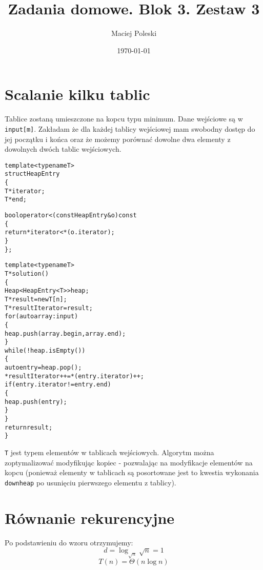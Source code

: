\documentclass[a4paper,12pt]{article}
\title{Zadania domowe. Blok 3. Zestaw 3}
\author{Maciej Poleski}
\date{\today}
\begin{document}
\maketitle

\newpage

\section{Scalanie kilku tablic}
Tablice zostaną umieszczone na kopcu typu minimum. Dane wejściowe są w \verb|input[m]|. Zakładam że dla każdej tablicy wejściowej mam swobodny dostęp do jej początku i końca oraz że możemy porównać dowolne dwa elementy z dowolnych dwóch tablic wejściowych.
\begin{alltt}
template<typename T>
struct HeapEntry
\{
    T *iterator;
    T *end;
    
    bool operator<(const HeapEntry &o) const
    \{
        return *iterator<*(o.iterator);
    \}
\};

template<typename T>
T* solution()
\{
    Heap<HeapEntry<T>> heap;
    T* result=new T[n];
    T* resultIterator=result;
    for(auto array : input)
    \{
        heap.push({array.begin, array.end});
    \}
    while(!heap.isEmpty())
    \{
        auto entry=heap.pop();
        *resultIterator++=*(entry.iterator)++;
        if(entry.iterator!=entry.end)
        \{
            heap.push(entry);
        \}
    \}
    return result;
\}
\end{alltt}
\verb|T| jest typem elementów w tablicach wejściowych. Algorytm można zoptymalizować modyfikując kopiec - pozwalając na modyfikacje elementów na kopcu (ponieważ elementy w tablicach są posortowane jest to kwestia wykonania \verb|downheap| po usunięciu pierwszego elementu z tablicy).

\section{Równanie rekurencyjne}
Po podstawieniu do wzoru otrzymujemy:
$$d=\log_{\sqrt{n}}\sqrt{n}=1$$
$$T(n)=\Theta(n\log{n})$$
\end{document}
